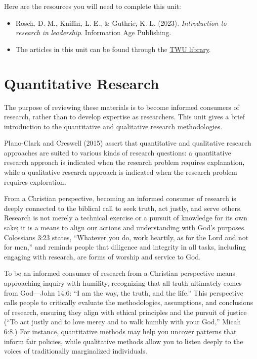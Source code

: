 \documentclass[
  letterpaper,
  DIV=11,
  numbers=noendperiod]{scrreprt}
\providecommand{\tightlist}{%
  \setlength{\itemsep}{0pt}\setlength{\parskip}{0pt}}\usepackage{longtable,booktabs,array}
\begin{document}
Here are the resources you will need to complete this unit:

\begin{itemize}
\tightlist
\item
  Rosch, D. M., Kniffin, L. E., \& Guthrie, K. L. (2023).
  \emph{Introduction to research in leadership}. Information Age
  Publishing.
\item
  The articles in this unit can be found through the
  \href{https://www.twu.ca/academics/library}{TWU library}.
\end{itemize}


\chapter*{Quantitative Research}\label{quantitative-research}


The purpose of reviewing these materials is to become informed consumers
of research, rather than to develop expertise as researchers. This unit
gives a brief introduction to the quantitative and qualitative research
methodologies.

Plano-Clark and Creswell (2015) assert that quantitative and qualitative
research approaches are suited to various kinds of research questions: a
quantitative research approach is indicated when the research problem
requires explanation\textbf{,} while a qualitative research approach is
indicated when the research problem requires exploration\textbf{.}

From a Christian perspective, becoming an informed consumer of research
is deeply connected to the biblical call to seek truth, act justly, and
serve others. Research is not merely a technical exercise or a pursuit
of knowledge for its own sake; it is a means to align our actions and
understanding with God's purposes. Colossians 3:23 states, ``Whatever
you do, work heartily, as for the Lord and not for men,'' and reminds
people that diligence and integrity in all tasks, including engaging
with research, are forms of worship and service to God.

To be an informed consumer of research from a Christian perspective
means approaching inquiry with humility, recognizing that all truth
ultimately comes from God---John 14:6: ``I am the way, the truth, and
the life.'' This perspective calls people to critically evaluate the
methodologies, assumptions, and conclusions of research, ensuring they
align with ethical principles and the pursuit of justice (``To act
justly and to love mercy and to walk humbly with your God,'' Micah 6:8.)
For instance, quantitative methods may help you uncover patterns that
inform fair policies, while qualitative methods allow you to listen
deeply to the voices of traditionally marginalized individuals.
\end{document}
